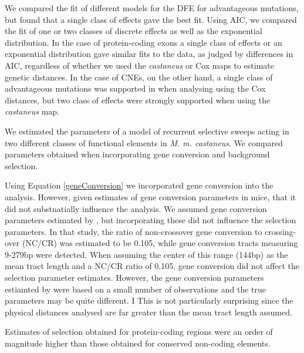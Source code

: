 	We compared the fit of different models for the DFE for advantageous mutations, but found that a single class of effects gave the best fit. Using AIC, we compared the fit of one or two classes of discrete effects as well as the exponential distribution. In the case of protein-coding exons a single class of effects or an exponential distribution gave similar fits to the data, as judged by differences in AIC, regardless of whether we used the \textit{castaneus} or Cox maps to estimate genetic distances. In the case of CNEs, on the other hand, a single class of advantageous mutations was supported in when analysing using the Cox distances, but two class of effects were strongly supported when using the \textit{castaneus} map. 

	We estimated the parameters of a model of recurrent selective sweeps acting in two different classes of functional elements in \textit{M. m. castaneus}. We compared parameters obtained when incorporating gene conversion and background selection.
	
	Using  Equation \ref{geneConversion} we incorporated gene conversion into the analysis. However, given estimates of gene conversion parameters in mice, that it did not substnatially influence the analysis. We assumed gene conversion parameters estimated by \cite{RN263}, but incorporating these did not influence the selection parameters. In that study, the ratio of non-crossover gene conversion to crossing-over (NC/CR) was estimated to be 0.105, while gene conversion tracts measuring 9-279bp were detected. When assuming the center of this range (144bp) as the mean tract length and a NC/CR ratio of 0.105, gene conversion did not affect the selection parameter estimates. However, the gene conversion parameters estiamted by \cite{RN263} were based on a small number of observations and the true parameters may be quite different. I
	This is not particularly surprising since the physical distances analysed are far greater than the mean tract length assumed.  

Estimates of selection obtained for protein-coding regions were an order of magnitude higher than those obtained for conserved non-coding elements. 




%
%

%
%

